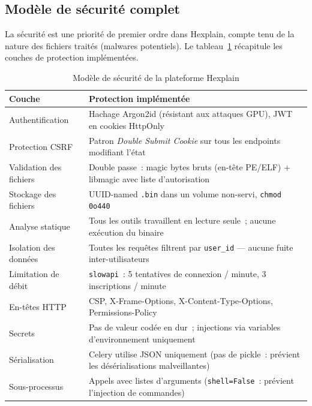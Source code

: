 \subsection{Modèle de sécurité complet}

La sécurité est une priorité de premier ordre dans Hexplain, compte tenu de la nature des fichiers traités (malwares potentiels). Le tableau~\ref{tab:security_model} récapitule les couches de protection implémentées.

\begin{table}[H]
  \centering
  \caption{Modèle de sécurité de la plateforme Hexplain}
  \label{tab:security_model}
  \begin{tabularx}{\textwidth}{l X}
    \toprule
    \textbf{Couche} & \textbf{Protection implémentée} \\
    \midrule
    Authentification & Hachage Argon2id (résistant aux attaques GPU), JWT en cookies HttpOnly \\
    Protection CSRF & Patron \textit{Double Submit Cookie} sur tous les endpoints modifiant l'état \\
    Validation des fichiers & Double passe~: magic bytes bruts (en-tête PE/ELF) + libmagic avec liste d'autorisation \\
    Stockage des fichiers & UUID-named \texttt{.bin} dans un volume non-servi, \texttt{chmod 0o440} \\
    Analyse statique & Tous les outils travaillent en lecture seule~; aucune exécution du binaire \\
    Isolation des données & Toutes les requêtes filtrent par \texttt{user\_id} --- aucune fuite inter-utilisateurs \\
    Limitation de débit & \texttt{slowapi}~: 5 tentatives de connexion / minute, 3 inscriptions / minute \\
    En-têtes HTTP & CSP, X-Frame-Options, X-Content-Type-Options, Permissions-Policy \\
    Secrets & Pas de valeur codée en dur~; injections via variables d'environnement uniquement \\
    Sérialisation & Celery utilise JSON uniquement (pas de pickle~: prévient les désérialisations malveillantes) \\
    Sous-processus & Appels avec listes d'arguments (\texttt{shell=False}~: prévient l'injection de commandes) \\
    \bottomrule
  \end{tabularx}
\end{table}

